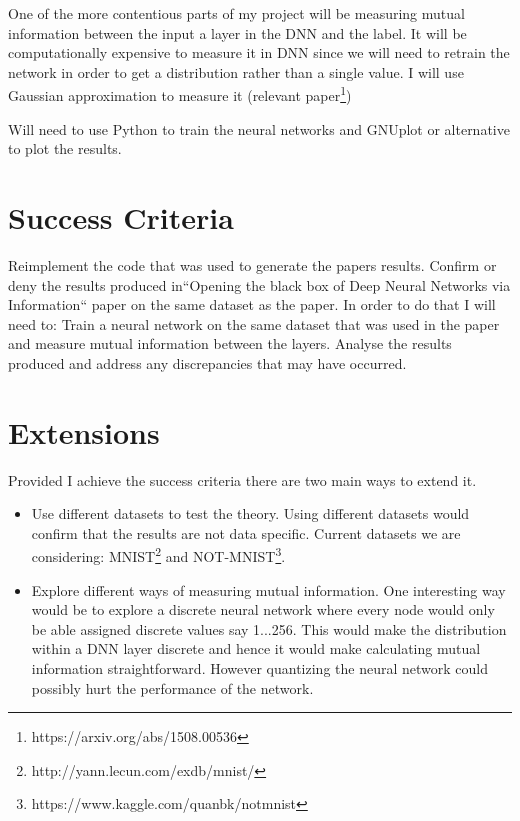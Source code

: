 \documentclass[12pt]{article}
\begin{document}
One of the more contentious parts of my project will be measuring mutual
information between the input a layer in the DNN and the label. It will be
computationally expensive to measure it in DNN since we will need to retrain the
network in order to get a distribution rather than a single value. I will use
Gaussian approximation to measure it (relevant
paper\footnote{https://arxiv.org/abs/1508.00536})

Will need to use Python to train the neural networks and GNUplot or alternative
to plot the results.

\section*{Success Criteria}

Reimplement the code that was used to generate the papers results. Confirm or
deny the results produced in``Opening the black box of Deep Neural Networks via
Information`` paper on the same dataset as the paper. In order to do that I will
need to: Train a neural network on the same dataset that was used in the paper
and measure mutual information between the layers. Analyse the results produced
and address any discrepancies that may have occurred.

\section*{Extensions}

Provided I achieve the success criteria there are two main ways to extend it.

\begin{itemize}
  \item {
      Use different datasets to test the theory. Using different datasets would
      confirm that the results are not data specific. Current datasets we
      are considering: MNIST\footnote{http://yann.lecun.com/exdb/mnist/} and
      NOT-MNIST\footnote{https://www.kaggle.com/quanbk/notmnist}.
  }
  \item {
      Explore different ways of measuring mutual information. One interesting
      way would be to explore a discrete neural network where every node would
      only be able assigned discrete values say {1...256}. This would make the
      distribution within a DNN layer discrete and hence it would make
      calculating mutual information straightforward. However quantizing the
      neural network could possibly hurt the performance of the network.
  }
\end{itemize}
\end{document}
